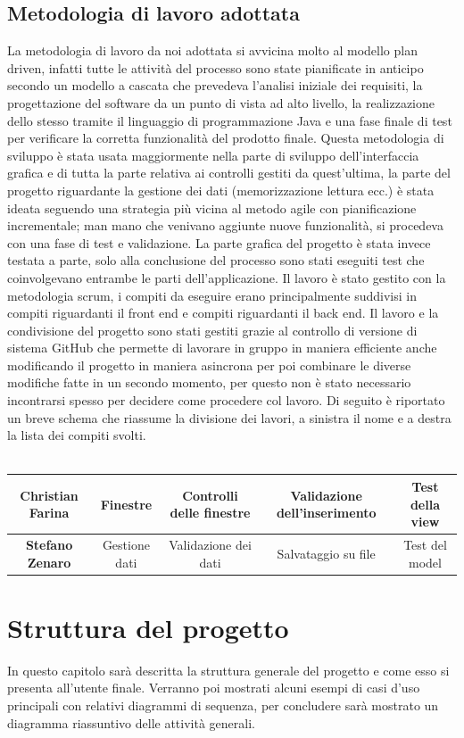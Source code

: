 \documentclass[ 4paper,11pt,openany]{book}
\begin{document}
\section{Metodologia di lavoro adottata}
La metodologia di lavoro da noi adottata si avvicina molto al modello plan driven, infatti tutte le attività del processo sono state pianificate in anticipo secondo un modello a cascata che prevedeva l'analisi iniziale dei requisiti, la progettazione del software da un punto di vista ad alto livello, la realizzazione dello stesso tramite il linguaggio di programmazione Java e una fase finale di test per verificare la corretta funzionalità del prodotto finale.
Questa metodologia di sviluppo è stata usata maggiormente nella parte di sviluppo dell'interfaccia grafica e di tutta la parte relativa ai controlli gestiti da quest'ultima, la parte del progetto riguardante la gestione dei dati (memorizzazione lettura ecc.) è stata ideata seguendo una strategia più vicina al metodo agile con pianificazione incrementale; man mano che venivano aggiunte nuove funzionalità, si procedeva con una fase di test e validazione. La parte grafica del progetto è stata invece testata a parte, solo alla conclusione del processo sono stati eseguiti test che coinvolgevano entrambe le parti dell'applicazione. Il lavoro è stato gestito con la metodologia scrum, i compiti da eseguire erano principalmente suddivisi in compiti riguardanti il front end e compiti riguardanti il back end. Il lavoro e la condivisione del progetto sono stati gestiti grazie al controllo di versione di sistema GitHub che permette di lavorare in gruppo in maniera efficiente anche modificando il progetto in maniera asincrona per poi combinare le diverse modifiche fatte in un secondo momento, per questo non è stato necessario incontrarsi spesso per decidere come procedere col lavoro.  Di seguito è riportato un breve schema che riassume la divisione dei lavori, a sinistra il nome e a destra la lista dei compiti svolti.\\ \\
\begin{tabular}{|c|c|c|c|c|}
\hline
\textbf{Christian Farina} & Finestre & Controlli delle finestre & Validazione dell'inserimento & Test della view\\
\hline
\textbf{Stefano Zenaro} & Gestione dati & Validazione dei dati & Salvataggio su file & Test del model\\
\hline
\end{tabular}

\chapter{Struttura del progetto}
In questo capitolo sarà descritta la struttura generale del progetto e come esso si presenta all'utente finale. Verranno poi mostrati alcuni esempi di casi d'uso principali con relativi diagrammi di sequenza, per concludere sarà mostrato un diagramma riassuntivo delle attività generali.
\end{document}
